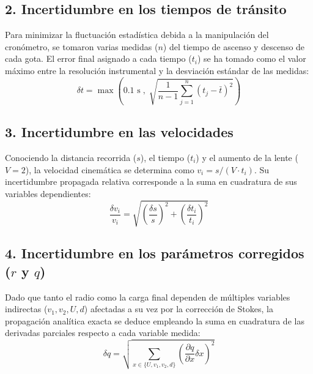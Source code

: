 \documentclass[9pt,a4paper,twocolumn,twoside]{rho-class/rho}
\begin{document}
\subsection*{2. Incertidumbre en los tiempos de tránsito}
Para minimizar la fluctuación estadística debida a la manipulación del cronómetro, se tomaron varias medidas ($n$) del tiempo de ascenso y descenso de cada gota. El error final asignado a cada tiempo ($t_i$) se ha tomado como el valor máximo entre la resolución instrumental y la desviación estándar de las medidas:
\vspace{0.2cm}
\begin{equation*}
    \delta t = \max \left( 0.1 \text{ s} \; , \; \sqrt{\frac{1}{n-1}\sum_{j=1}^{n} (t_{j} - \bar{t})^2} \right)
\end{equation*}
\vspace{0.2cm}

\subsection*{3. Incertidumbre en las velocidades}
Conociendo la distancia recorrida ($s$), el tiempo ($t_i$) y el aumento de la lente ($V=2$), la velocidad cinemática se determina como $v_i = s / (V \cdot t_i)$. Su incertidumbre propagada relativa corresponde a la suma en cuadratura de sus variables dependientes:
\vspace{0.2cm}
\begin{equation*}
    \frac{\delta v_i}{v_i} = \sqrt{\left(\frac{\delta s}{s}\right)^2 + \left(\frac{\delta t_i}{t_i}\right)^2}
\end{equation*}
\vspace{0.2cm}

\subsection*{4. Incertidumbre en los parámetros corregidos ($r$ y $q$)}

Dado que tanto el radio como la carga final dependen de múltiples variables indirectas ($v_1, v_2, U, d$) afectadas a su vez por la corrección de Stokes, la propagación analítica exacta se deduce empleando la suma en cuadratura de las derivadas parciales respecto a cada variable medida:
\vspace{0.2cm}
\begin{equation*}
    \delta q = \sqrt{ \sum_{x \in \{U, v_1, v_2, d\}} \left( \frac{\partial q}{\partial x} \delta x \right)^2 }
\end{equation*}
\vspace{0.2cm}
\end{document}
